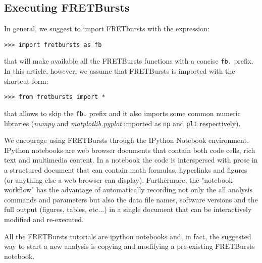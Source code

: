 \subsection{Executing FRETBursts}
In general, we suggest to import FRETbursts with the expression:

\begin{verbatim}
>>> import fretbursts as fb
\end{verbatim}

that will make available all the FRETBursts functions with a concise \verb|fb.|
prefix. In this article, however, we assume that FRETBursts is imported with the
shortcut form:

\begin{verbatim}
>>> from fretbursts import *
\end{verbatim}

that allows to skip the \verb|fb.| prefix and it also imports some common numeric
libraries (\textit{numpy} and \textit{matplotlib.pyplot} imported as 
\verb|np| and \verb|plt| respectively).

We encourage using FRETBursts through the IPython Notebook environment. 
IPython notebooks are web browser documents that contain
both code cells, rich text and multimedia content. In a notebook the code is 
interspersed with prose in a structured document that can contain math 
formulas, hyperlinks and figures (or anything else a web browser can display).
Furthermore, the "notebook workflow"\cite{Shen_2014} has the advantage 
of automatically recording not only the all analysis commands and parameters 
but also the data file names, software versions and the full output 
(figures, tables, etc...) in a single document that can be interactively 
modified and re-executed.

All the FRETBursts tutorials are 
ipython notebooks and, in fact, the suggested way to start a new analysis is 
copying and modifying a pre-existing FRETBursts notebook.
